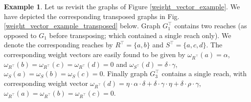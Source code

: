 \documentclass[reqno,12pt,letterpaper]{amsart}
\numberwithin{equation}{section}
\newcommand{\1}{\mathds{1}}
\theoremstyle{definition}
\newtheorem{Ex}[Th]{Example}
\begin{document}
\begin{Ex}\label{weight_vector_example_writing_II}
	Let us revisit the graphs of Figure \ref{weight_vector_example}. We have depicted the corresponding transposed graphs in Fig. \ref{weight_vector_example_transposed} below. Graph $G_1^\intercal$ contains two reaches (as opposed to $G_1$ before transposing; which contained a single reach only). We denote the corresponding reaches by $R^\intercal = \{a,b\}$ and $S^\intercal = \{a,c,d\}$. The corresponding weight vectors are easily found to be given by $\omega_{R^\intercal}(a) = \alpha $, $\omega_{R^\intercal}(b) = \omega_{R^\intercal}(c) = \omega_{R^\intercal}(d) = 0$ and $\omega_{S^\intercal}(d) = \delta \cdot \gamma$, $\omega_S(a) = \omega_S(b) = \omega_S(c) = 0$. Finally graph $G_3^\intercal$ contains a single reach, with corresponding weight vector $\omega_{R^\intercal}(d) = \eta \cdot \alpha \cdot \delta + \delta \cdot \gamma \cdot \eta + \delta \cdot \rho \cdot \gamma$, $\omega_{R^\intercal}(a) = \omega_{R^\intercal}(b) = \omega_{R^\intercal}(c) = 0$.
\end{Ex}
\end{document}

